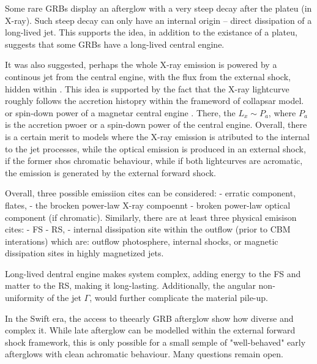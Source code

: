Some rare GRBs display an afterglow with a very steep decay after the plateu (in X-ray). Such steep decay can only have an internal origin -- direct dissipation of a long-lived jet. This supports the idea, in addition to the existance of a plateu, suggests that some GRBs have a long-lived central engine.

It was also suggested, perhaps the whole X-ray emission is powered by a continous jet from the central engine, with the flux from the external shock, hidden within \cite{Ghisellini et al., 2007}. This idea is supported by the fact that the X-ray lightcurve roughly follows the accretion histopry within the frameword of collapsar model. \cite{Kumar et al., 2008a,b; Cannizzo and Gehrels, 2009; Lindner et al., 2010} or spin-down power of a magnetar central engine \cite{Yu et al., 2010; Metzger et al., 2011}. There, the $L_{x}\sim P_a$, where $P_a$ is the accretion pwoer or a spin-down power of the central engine.
Overall, there is a certain merit to models where the X-ray emission is atributed to the internal to the jet processes, while the optical emission is produced in an external shock, if the former shos chromatic behaviour, while if both lightcurves are acromatic, the emission is generated by the external forward shock.

Overall, three possible emissiion cites can be considered:
- erratic component, flates,
- the brocken power-law X-ray compoennt
- broken power-law optical component (if chromatic).
Similarly, there are at least three physical emisison cites:
- FS
- RS, 
- internal dissipation site within the outflow (prior to CBM interations) which are: outflow photosphere, internal shocks, or magnetic dissipation sites in highly magnetized jets.

Long-lived dentral engine makes system complex, adding energy to the FS and matter to the RS, making it long-lasting. Additionally, the angular non-uniformity of the jet $\Gamma$, would further complicate the material pile-up.

In the Swift era, the access to theearly GRB afterglow show how diverse and complex it. While late afterglow can be modelled within the external forward shock framework, this is only possible for a small semple of "well-behaved" early afterglows with clean achromatic behaviour. Many questions remain open. 


